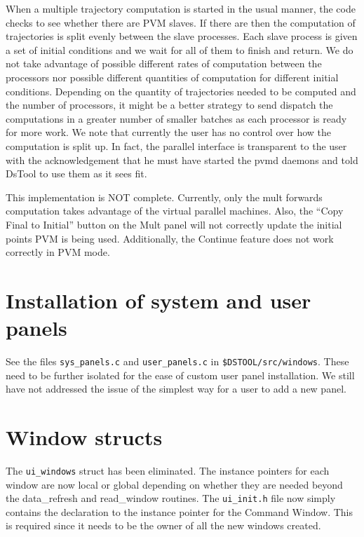 When a multiple trajectory computation is started in the usual manner,
the code checks to see whether there are PVM slaves.  If there are
then the computation of trajectories is split evenly between the
slave processes.  Each slave process is given a set of initial
conditions and we wait for all of them to finish and return.  We
do not take advantage of possible different rates of computation
between the processors nor possible different quantities of computation
for different initial conditions.  Depending on the quantity of
trajectories needed to be computed and the number of processors, it might
be a better strategy to send dispatch the computations in a greater number
of smaller batches as each processor is ready for more work.
We note that currently the user has no control over how the
computation is split up.  In fact, the parallel interface is transparent
to the user with the acknowledgement that he must have started the pvmd daemons
and told DsTool to use them as it sees fit.

This implementation is NOT complete.
Currently, only the mult forwards computation takes advantage of the
virtual parallel machines.  Also, the ``Copy Final to Initial'' button on the
Mult panel will not correctly update the initial points PVM is being used.
Additionally, the Continue feature does not work correctly in PVM mode.


\section{Installation of system and user panels}

See the files {\tt sys\_panels.c} and {\tt user\_panels.c}
in {\tt \$DSTOOL/src/windows}.  These need to be further isolated for
the ease of custom user panel installation.  We still have not addressed the
issue of the simplest way for a user to add a new panel.


\section{Window structs}

The {\tt ui\_windows} struct has been eliminated.  The instance pointers
for each window are now local or global depending on whether
they are needed beyond the data\_refresh and read\_window routines.  
The {\tt ui\_init.h} file now simply contains the declaration to
the instance pointer for the Command Window.  This is required since
it needs to be the owner of all the new windows created.


